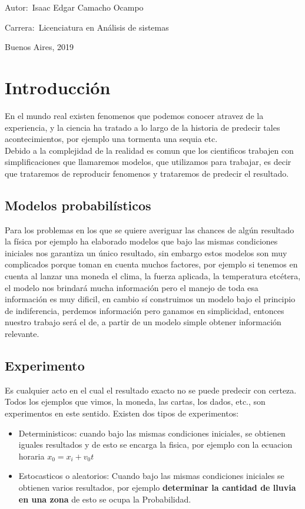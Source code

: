 \documentclass[12pt]{book}
\begin{document}
\noindent Autor:\,	Isaac Edgar Camacho Ocampo
 
\noindent Carrera:\,	Licenciatura en An\'alisis de sistemas

\vspace{1cm}

\vspace{1cm}

\noindent Buenos Aires, 2019

\newpage


\tableofcontents
\chapter{Introducción}En el mundo real existen fenomenos que podemos conocer atravez de la experiencia, y la ciencia ha tratado a lo largo de la historia de predecir tales acontecimientos, por ejemplo una tormenta una sequia etc. 
\\
Debido a la complejidad de la realidad es comun que los cientificos trabajen con simplificaciones que llamaremos modelos, que utilizamos para trabajar, es decir que trataremos de reproducir fenomenos y trataremos de predecir el resultado.
\\
\section{Modelos probabilísticos}Para los problemas en los que se quiere averiguar las chances de algún resultado la física por ejemplo ha elaborado modelos que bajo las mismas condiciones iniciales  nos garantiza un único resultado, sin embargo estos modelos son muy complicados porque toman en cuenta muchos factores, por ejemplo si tenemos en cuenta al lanzar una moneda el clima, la fuerza aplicada, la temperatura etcétera, el modelo nos brindará mucha información pero el manejo de toda esa información es muy dificil, en cambio  sí construimos un modelo bajo el principio de indiferencia, perdemos información pero ganamos en simplicidad, entonces nuestro trabajo será el de, a partir de un modelo simple obtener información relevante.

\section{Experimento}
Es cualquier acto en el cual el resultado exacto no se puede predecir con certeza. Todos los ejemplos que vimos, la moneda, las cartas, los dados, etc., son experimentos en este sentido. Existen dos tipos de experimentos:
\begin{itemize}
\item Deterministicos: cuando bajo las mismas condiciones iniciales, se obtienen iguales resultados y de esto se encarga la fisica, por ejemplo con la ecuacion horaria $x_0 = x_i + v_0 t$

\item Estocasticos o aleatorios: Cuando bajo las mismas condiciones iniciales se obtienen varios resultados, por ejemplo \textbf{determinar la cantidad de lluvia en una zona} de esto se ocupa la Probabilidad.
\end{itemize}
\end{document}
